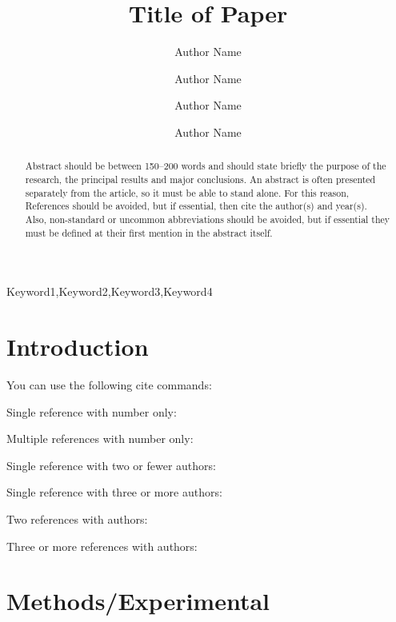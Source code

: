 \documentclass[12pt]{ussci}
\title{ Title of Paper }
\author[1]{Author Name}
\author[1]{Author Name}
\author[2]{Author Name}
\author[2,*]{Author Name}
\affil[1]{Department, Institution, Address, Country}
\affil[2]{Department, Institution, Address, Country}
\affil[*]{Corresponding author: \email{author@university.edu}}
\begin{document}
\maketitle

\begin{abstract} %
Abstract should be between 150--200 words and should state briefly the purpose
of the research, the principal results and major conclusions. An abstract is
often presented separately from the article, so it must be able to stand alone.
For this reason, References should be avoided, but if essential, then cite the
author(s) and year(s). Also, non-standard or uncommon abbreviations should be
avoided, but if essential they must be defined at their first mention in the
abstract itself.
\end{abstract}

\begin{keyword}
    Keyword1\sep Keyword2\sep Keyword3\sep Keyword4
\end{keyword}

\section{Introduction}
%

You can use the following cite commands:

Single reference with number only: \cite{Zhao2013}

Multiple references with number only: \cite{Affleck1967,Turanyi2014,uconnrcmpy}

Single reference with two or fewer authors: \textcite{Affleck1967}

Single reference with three or more authors: \textcite{Wang2011}

Two references with authors: \textcite{Kee1996,Baumgardner2013}

Three or more references with authors: \textcite{Kee1996,Baumgardner2013,Haworth2011}


\section{Methods/Experimental}
%
\blindtext
\end{document}
